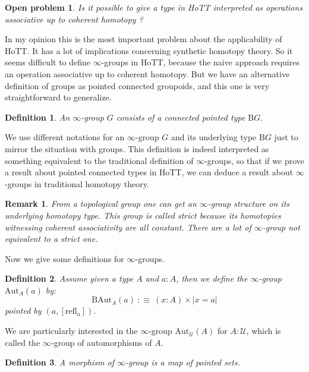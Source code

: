 \documentclass{article}
\newcommand{\U}{{\mathcal U}}
\newcommand{\refl}{\mathrm{refl}}
\newcommand{\B}{\mathrm{B}}
\newcommand{\Aut}{\mathrm{Aut}}
\newtheorem{definition}{Definition}
\newtheorem{remark}{Remark}
\newtheorem{open_problem}{Open problem}
\begin{document}
\begin{open_problem}
Is it possible to give a type in HoTT interpreted as operations associative up to coherent homotopy ?
\end{open_problem}

In my opinion this is the most important problem about the applicability of HoTT. It has a lot of implications concerning synthetic homotopy theory. So it seems difficult to define $\infty$-groups in HoTT, because the naive approach requires an operation associative up to coherent homotopy. But we have an alternative definition of groups as pointed connected groupoids, and this one is very straightforward to generalize.

\begin{definition}
An $\infty$-group $G$ consists of a connected pointed type $\B G$.
\end{definition}

We use different notations for an $\infty$-group $G$ and its underlying type $\B G$ just to mirror the situation with groups. This definition is indeed interpreted as something equivalent to the traditional definition of $\infty$-groups, so that if we prove a result about pointed connected types in HoTT, we can deduce a result about $\infty$-groups in traditional homotopy theory. 

\begin{remark}
From a topological group one can get an $\infty$-group structure on its underlying homotopy type. This group is called strict because its homotopies witnessing coherent associativity are all constant. There are a lot of $\infty$-group not equivalent to a strict one.%
\end{remark}

Now we give some definitions for $\infty$-groups.

\begin{definition}
Assume given a type $A$ and $a:A$, then we define the $\infty$-group $\Aut_A(a)$ by:
\[\B \Aut_A(a) \ :\equiv\ (x:A)\times |x=a|\]
pointed by $(a,[\refl_a])$.
\end{definition}

We are particularly interested in the $\infty$-group $\Aut_\U(A)$ for $A:\U$, which is called the $\infty$-group of automorphisms of $A$.

\begin{definition}
A morphism of $\infty$-group is a map of pointed sets. 
\end{definition}
\end{document}
